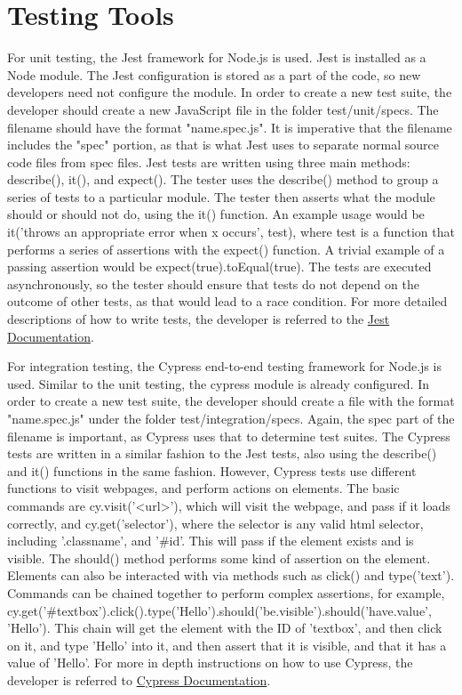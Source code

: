 \documentclass[12pt]{article}
\begin{document}
    \section{Testing Tools}
    For unit testing, the Jest framework for Node.js is used. Jest is installed as a Node
    module. The Jest configuration is stored as a part of the code, so new developers need not
    configure the module. In order to create a new test suite, the developer should create a
    new JavaScript file in the folder test/unit/specs. The filename should have the format
    "name.spec.js". It is imperative that the filename includes the "spec" portion, as that is
    what Jest uses to separate normal source code files from spec files.
    Jest tests are written using three main methods: describe(), it(), and expect().
    The tester uses the describe() method to group a series of tests to a particular module.
    The tester then asserts what the module should or should not do, using the it() function.
    An example usage would be it('throws an appropriate error when x occurs', test), where
    test is a function that performs a series of assertions with the expect() function.
    A trivial example of a passing assertion would be expect(true).toEqual(true). The tests
    are executed asynchronously, so the tester should ensure that tests do not depend on the
    outcome of other tests, as that would lead to a race condition. For more detailed
    descriptions of how to write tests, the developer is referred to the 
    \href{https://jestjs.io/docs/en/using-matchers}{Jest Documentation}.
    
    For integration testing, the Cypress end-to-end testing framework for Node.js is used.
    Similar to the unit testing, the cypress module is already configured. In order to
    create a new test suite, the developer should create a file with the format "name.spec.js"
    under the folder test/integration/specs. Again, the spec part of the filename is important,
    as Cypress uses that to determine test suites. The Cypress tests are written in a similar fashion
    to the Jest tests, also using the describe() and it() functions in the same fashion. However,
    Cypress tests use different functions to visit webpages, and perform actions on elements.
    The basic commands are cy.visit('<url>'), which will visit the webpage, and pass if it
    loads correctly, and cy.get('selector'), where the selector is any valid html selector,
    including '.classname', and '\#id'. This will pass if the element exists and is visible.
    The should() method performs some kind of assertion on the element. Elements can also be interacted
    with via methods such as click() and type('text').
    Commands can be chained together to perform complex assertions, for example,
    cy.get('\#textbox').click().type('Hello').should('be.visible').should('have.value', 'Hello').
    This chain will get the element with the ID of 'textbox', and then click on it, and type
    'Hello' into it, and then assert that it is visible, and that it has a value of 'Hello'.
    For more in depth instructions on how to use Cypress, the developer is referred to 
    \href{https://docs.cypress.io/api/introduction/api.html#Sections}{Cypress Documentation}.
    
\end{document}
